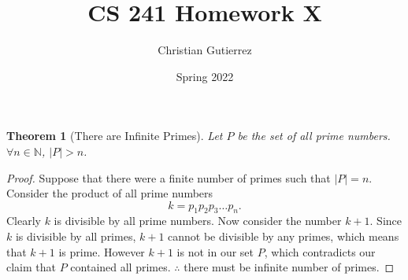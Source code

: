\documentclass{article}
\title{CS 241 Homework X}
\author{Christian Gutierrez}
\date{Spring 2022}
\newtheorem{theorem}{Theorem}
\begin{document}
\maketitle

\newpage

\begin{theorem}[There are Infinite Primes]
    Let $P$ be the set of all prime numbers. $\forall n\in\mathbb{N}$, $|P|>n$.
\end{theorem}
\begin{proof}
    Suppose that there were a finite number of primes such that $|P|=n$. Consider the product of all prime numbers
    \begin{equation}
        k = p_1p_2p_3\ldots p_n.
    \end{equation}
    Clearly $k$ is divisible by all prime numbers. Now consider the number $k+1$. Since $k$ is divisible by all primes, $k+1$ cannot be divisible by any primes, which means that $k+1$ is prime. However $k+1$ is not in our set $P$, which contradicts our claim that $P$ contained all primes. $\therefore$ there must be infinite number of primes. 
\end{proof}


\newpage
\end{document}
